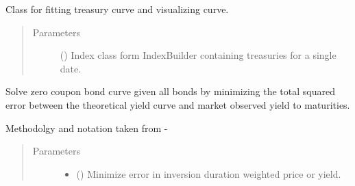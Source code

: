 \documentclass[letterpaper,10pt,english]{report}
\begin{document}

\begin{fulllineitems}
\label{\detokenize{index:lgimapy.models.TreasuryCurveBuilder}}
Class for fitting treasury curve and visualizing curve.
\begin{quote}\begin{description}
\item[{Parameters}] \leavevmode
{} ({\hyperref[\detokenize{index:lgimapy.index.Index}]{}}) \textendash{} Index class form IndexBuilder containing treasuries
for a single date.

\end{description}\end{quote}


\begin{fulllineitems}
\end{fulllineitems}



\begin{fulllineitems}
\end{fulllineitems}


\begin{fulllineitems}
\label{\detokenize{index:lgimapy.models.TreasuryCurveBuilder.fit}}
Solve zero coupon bond curve given all bonds by minimizing
the total squared error between the theoretical yield curve
and market observed yield to maturities.

Methodolgy and notation taken from
- 
\begin{quote}\begin{description}
\item[{Parameters}] \leavevmode\begin{itemize}
\item {} 
 (\sphinxstyleliteralemphasis{\sphinxupquote{, }}\sphinxstyleliteralemphasis{\sphinxupquote{, }}) \textendash{} Minimize error in inversion duration weighted price or yield.


\end{itemize}
\end{description}
\end{quote}
\end{fulllineitems}
\end{fulllineitems}
\end{document}
